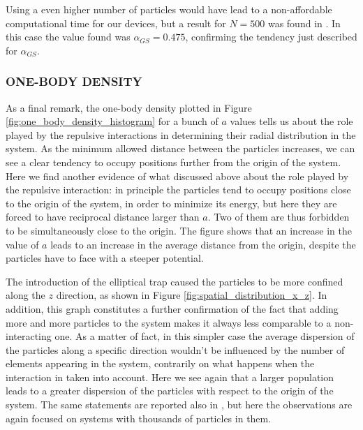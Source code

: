 Using a even higher number of particles would have lead to a non-affordable computational time for our devices, but a result for $N=500$ was found in \cite{Nilsen2005}. In this case the value found was $\alpha_{GS}=0.475$, confirming the tendency just described for $\alpha_{GS}$.  \\

\subsubsection*{ONE-BODY DENSITY}
As a final remark, the one-body density plotted in Figure \ref{fig:one_body_density_histogram} for a bunch of $a$ values tells us about the role played by the repulsive interactions in determining their radial distribution in the system. As the minimum allowed distance between the particles increases, we can see a clear tendency to occupy positions further from the origin of the system. Here we find another evidence of what discussed above about the role played by the repulsive interaction: in principle the particles tend to occupy positions close to the origin of the system, in order to minimize its energy, but here they are forced to have reciprocal distance larger than $a$. Two of them are thus forbidden to be simultaneously close to the origin. The figure shows that an increase in the value of $a$ leads to an increase in the average distance from the origin, despite the particles have to face with a steeper potential.

The introduction of the elliptical trap caused the particles to be more confined along the $z$ direction, as shown in Figure \ref{fig:spatial_distribution_x_z}. In addition, this graph constitutes a further confirmation of the fact that adding more and more particles to the system makes it always less comparable to a non-interacting one. As a matter of fact, in this simpler case the average dispersion of the particles along a specific direction wouldn't be influenced by the number of elements appearing in the system, contrarily on what happens when the interaction in taken into account. Here we see again that a larger population leads to a greater dispersion of the particles with respect to the origin of the system. The same statements are reported also in \cite{duBois}, but here the observations are again focused on systems with thousands of particles in them. 






